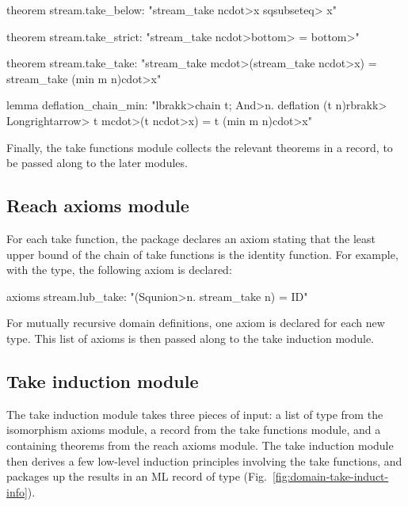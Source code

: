 \begin{isacode}
theorem stream.take_below: "stream_take n\<cdot>x \<sqsubseteq> x"
\end{isacode}
\unmedskip
{}
\begin{isacode}
theorem stream.take_strict: "stream_take n\<cdot>\<bottom> = \<bottom>"
\end{isacode}
\unmedskip
{}
\begin{isacode}
theorem stream.take_take:
  "stream_take m\<cdot>(stream_take n\<cdot>x) = stream_take (min m n)\<cdot>x"
\end{isacode}
\unmedskip
{}
\begin{isacode}
lemma deflation_chain_min:
  "\<lbrakk>chain t; \<And>n. deflation (t n)\<rbrakk> \<Longrightarrow> t m\<cdot>(t n\<cdot>x) = t (min m n)\<cdot>x"
\end{isacode}
%
Finally, the take functions module collects the relevant theorems in a  record, to be passed along to the later modules.

\subsection{Reach axioms module}

For each take function, the {\domain} package declares an axiom stating that the least upper bound of the chain of take functions is the identity function. For example, with the  type, the following axiom is declared:
%
\begin{isacode}
axioms stream.lub_take: "(\<Squnion>n. stream_take n) = ID"
\end{isacode}
%
For mutually recursive domain definitions, one axiom is declared for each new type. This list of axioms is then passed along to the take induction module.

\subsection{Take induction module}

The take induction module takes three pieces of input: a list of type   from the isomorphism axioms module, a  record from the take functions module, and a  containing  theorems from the reach axioms module. The take induction module then derives a few low-level induction principles involving the take functions, and packages up the results in an ML record of type  (Fig.~\ref{fig:domain-take-induct-info}).

